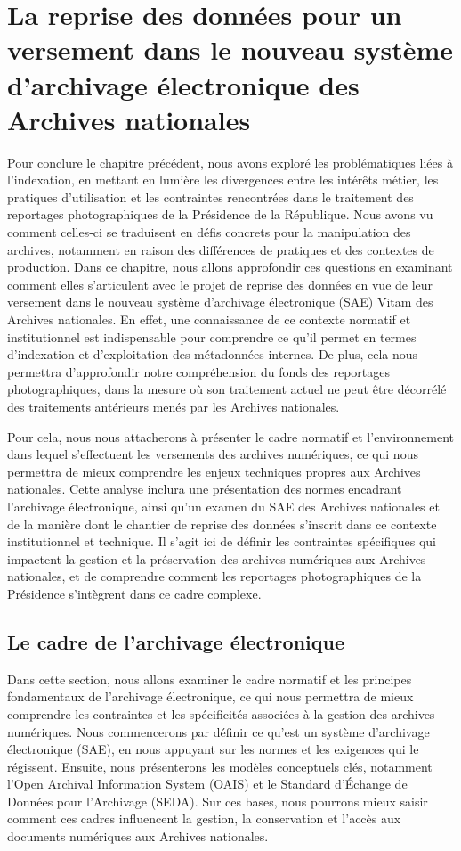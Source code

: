 \chapter{La reprise des données pour un versement dans le nouveau système d'archivage électronique des Archives nationales}

Pour conclure le chapitre précédent, nous avons exploré les problématiques liées à l’indexation, en mettant en lumière les divergences entre les intérêts métier, les pratiques d’utilisation et les contraintes rencontrées dans le traitement des reportages photographiques de la Présidence de la République. Nous avons vu comment celles-ci se traduisent en défis concrets pour la manipulation des archives, notamment en raison des différences de pratiques et des contextes de production. Dans ce chapitre, nous allons approfondir ces questions en examinant comment elles s'articulent avec le projet de reprise des données en vue de leur versement dans le nouveau système d'archivage électronique (SAE) Vitam des Archives nationales. En effet, une connaissance de ce contexte normatif et institutionnel est indispensable pour comprendre ce qu'il permet en termes d'indexation et d'exploitation des métadonnées internes. De plus, cela nous permettra d'approfondir notre compréhension du fonds des reportages photographiques, dans la mesure où son traitement actuel ne peut être décorrélé des traitements antérieurs menés par les Archives nationales.

Pour cela, nous nous attacherons à présenter le cadre normatif et l'environnement dans lequel s’effectuent les versements des archives numériques, ce qui nous permettra de mieux comprendre les enjeux techniques propres aux Archives nationales. Cette analyse inclura une présentation des normes encadrant l'archivage électronique, ainsi qu'un examen du SAE des Archives nationales et de la manière dont le chantier de reprise des données s’inscrit dans ce contexte institutionnel et technique. Il s'agit ici de définir les contraintes spécifiques qui impactent la gestion et la préservation des archives numériques aux Archives nationales, et de comprendre comment les reportages photographiques de la Présidence s'intègrent dans ce cadre complexe.

\section{Le cadre de l’archivage électronique}

Dans cette section, nous allons examiner le cadre normatif et les principes fondamentaux de l'archivage électronique, ce qui nous permettra de mieux comprendre les contraintes et les spécificités associées à la gestion des archives numériques. Nous commencerons par définir ce qu'est un système d'archivage électronique (SAE), en nous appuyant sur les normes et les exigences qui le régissent. Ensuite, nous présenterons les modèles conceptuels clés, notamment l'Open Archival Information System (OAIS) et le Standard d'Échange de Données pour l'Archivage (SEDA). Sur ces bases, nous pourrons mieux saisir comment ces cadres influencent la gestion, la conservation et l'accès aux documents numériques aux Archives nationales.

